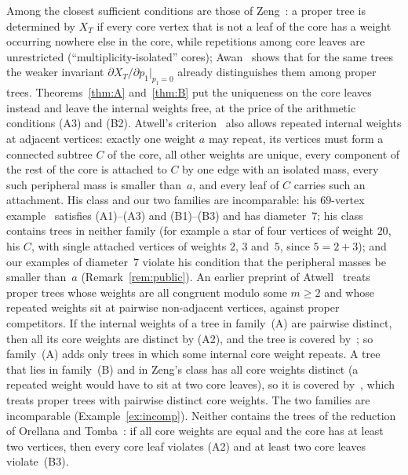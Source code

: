 \documentclass[11pt]{article}
\theoremstyle{definition}
\theoremstyle{remark}
\begin{document}
Among the closest sufficient conditions are those of Zeng~\cite[Theorem~1.1]{zeng}: a
proper tree is determined by $X_T$ if every core vertex that is not a leaf of the
core has a weight occurring nowhere else in the core, while repetitions among core
leaves are unrestricted (``multiplicity-isolated'' cores); Awan~\cite[Theorem~1]{awan}
shows that for the same trees the weaker invariant
$\partial X_T/\partial p_1|_{p_1=0}$ already distinguishes them among proper
trees. Theorems~\ref{thm:A} and~\ref{thm:B} put the uniqueness on the core
leaves instead and leave the internal weights free, at the price of the
arithmetic conditions (A3) and (B2). Atwell's criterion~\cite[Theorem~2.1]{atwell1}
also allows repeated internal weights at adjacent vertices: exactly one weight $a$
may repeat, its vertices must form a connected subtree $C$ of the core, all
other weights are unique, every component of the rest of the core is attached to
$C$ by one edge with an isolated mass, every such peripheral mass is smaller
than~$a$, and every leaf of $C$ carries such an attachment. His class and our two
families are incomparable: his $69$-vertex example~\cite[Section~6]{atwell1}
satisfies (A1)--(A3) and (B1)--(B3) and has diameter~$7$; his class contains trees
in neither family (for example a star of four vertices of weight $20$, his $C$, with single
attached vertices of weights $2$, $3$ and~$5$, since $5=2+3$); and our examples of diameter~$7$ violate his condition
that the peripheral masses be smaller than~$a$ (Remark~\ref{rem:public}). An
earlier preprint of Atwell~\cite{atwell2} treats proper trees whose weights are
all congruent modulo some $m\ge2$ and whose repeated weights sit at pairwise
non-adjacent vertices, against proper competitors. If the internal weights of a tree in
family~(A) are pairwise distinct, then all its core weights are distinct by
(A2), and the tree is covered by~\cite{zeng,awan}; so family~(A) adds only trees
in which some internal core weight repeats. A tree that lies in family~(B) and
in Zeng's class has all core weights distinct (a repeated weight would have to
sit at two core leaves), so it is covered by~\cite[Corollary~5.15]{got}, which
treats proper trees with pairwise distinct core weights. The two families are
incomparable (Example~\ref{ex:incomp}). Neither contains the trees of the
reduction of Orellana and Tomba~\cite[Corollary~4.12]{ot}: if all core weights
are equal and the core has at least two vertices, then every core leaf violates
(A2) and at least two core leaves violate~(B3).
\end{document}
